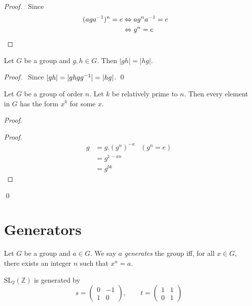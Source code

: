 \begin{proof}
    \pf\ Since
    \begin{align*}
        (ag{a}^{-1})^n = e & \Leftrightarrow a g^n {a}^{-1} = e        \\
                          & \Leftrightarrow g^n = e           & \relax
    \end{align*}
\end{proof}

\begin{prop}
    Let $G$ be a group and $g,h \in G$. Then $|gh| = |hg|$.
\end{prop}

\begin{proof}
    \pf\ Since $|gh| = |ghg{g}^{-1}| = |hg|$. \qed
\end{proof}

\begin{prop}
Let $G$ be a group of order $n$. Let $k$ be relatively prime to $n$. Then every element in $G$ has the form $x^k$ for some $x$.
\end{prop}

\begin{proof}
\begin{proof}
\pf
\begin{align*}
g & = g. (g^n)^{-a} & (g^n = e) \\
& = g^{1-an} \\
& = g^{bk}
\end{align*}
\end{proof}
\qed
\end{proof}

\section{Generators}

\begin{df}[Generator]
    Let $G$ be a group and $a \in G$. We say $a$ \emph{generates} the group iff, for all $x \in G$, there exists an integer $n$ such that $x^n = a$.
\end{df}

\begin{ex}
\label{ex:SL2Z}
$\mathrm{SL}_2(\mathbb{Z})$ is generated by
\[ s = \left( \begin{array}{cc}
0 & -1 \\ 1 & 0
\end{array} \right), \qquad
t = \left( \begin{array}{cc}
1 & 1 \\
0 & 1
\end{array} \right) \]
\end{ex}

